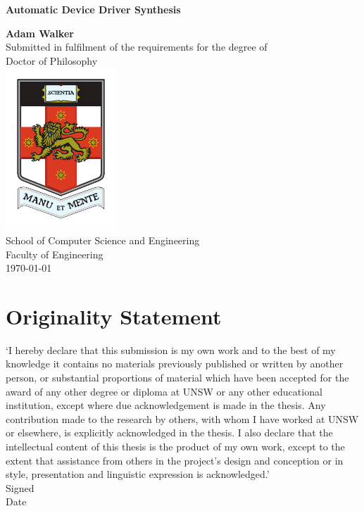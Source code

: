 \documentclass[a4paper,twoside,openright,11pt,oldfontcommands]{memoir}
\theoremstyle{definition}
\begin{document}
\nobibliography*

\frontmatter

\thispagestyle{empty}
\mbox{}
\vfill
\begin{center}
    {\Huge\sffamily\bfseries Automatic Device Driver Synthesis\\[2cm]\par}
{\Large\sffamily\bfseries Adam Walker}\\[1.5cm]
Submitted in fulfilment of the requirements for the degree of \\
Doctor of Philosophy\\[1cm]
\includegraphics[width=0.32\linewidth]{imgs/unsw-crest-color-smaller} \\[1cm]
School of Computer Science and Engineering \\[0.5cm]
Faculty of Engineering \\[1.5cm]
\monthyear\today
\end{center}
\par
\vfill
\clearpage



\thispagestyle{plain}
\section*{Originality Statement}

`I hereby declare that this submission is my own work and to the best of my
knowledge it contains no materials previously published or written by another
person, or substantial proportions of material which have been accepted for
the award of any other degree or diploma at UNSW or any other educational
institution, except where due acknowledgement is made in the thesis. Any
contribution made to the research by others, with whom I have worked at UNSW
or elsewhere, is explicitly acknowledged in the thesis.  I also declare that
the intellectual content of this thesis is the product of my own work, except
to the extent that assistance from others in the project's design and
conception or in style, presentation and linguistic expression is
acknowledged.'\\[0.5cm]
Signed\hspace{0.5cm}\dotfill\hfill\\[0.5cm]
Date\hspace{0.5cm}\dotfill\hfill\\
\vfil\newpage
\end{document}
